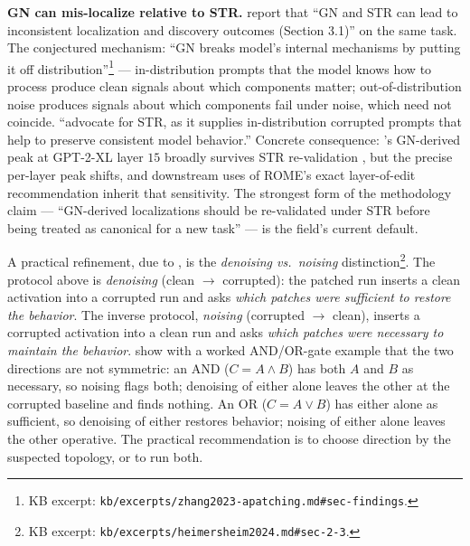 \begin{contradiction}
\textbf{GN can mis-localize relative to STR.}
\citet[\S 1]{zhang2023-apatching} report that ``GN and STR can lead to
inconsistent localization and  discovery outcomes (Section
3.1)'' on the same task. The conjectured mechanism: ``GN breaks
model's internal mechanisms by putting it off
distribution''\footnote{KB excerpt:
\texttt{kb/excerpts/zhang2023-apatching.md\#sec-findings}.} ---
in-distribution prompts that the model knows how to process produce
clean signals about which components matter; out-of-distribution noise
produces signals about which components fail under noise, which need
not coincide. \citet[\S 1]{zhang2023-apatching} ``advocate for STR, as
it supplies in-distribution corrupted prompts that help to preserve
consistent model behavior.'' Concrete consequence:
\citet{meng2022-rome}'s GN-derived  peak at GPT-2-XL layer $15$
broadly survives STR re-validation \citep[\S 3]{zhang2023-apatching},
but the precise per-layer peak shifts, and downstream uses of ROME's
exact layer-of-edit recommendation inherit that sensitivity. The
strongest form of the methodology claim --- ``GN-derived localizations
should be re-validated under STR before being treated as canonical
for a new task'' --- is the field's current default.
\end{contradiction}

A practical refinement, due to
\citet[\S 2.3]{heimersheim2024-apatching-howto}, is the
\emph{denoising vs.\ noising} distinction\footnote{KB excerpt:
\texttt{kb/excerpts/heimersheim2024.md\#sec-2-3}.}. The protocol
above is \emph{denoising} (clean $\to$ corrupted): the patched run
inserts a clean activation into a corrupted run and asks
\emph{which patches were sufficient to restore the behavior}. The
inverse protocol, \emph{noising} (corrupted $\to$ clean), inserts a
corrupted activation into a clean run and asks
\emph{which patches were necessary to maintain the behavior}.
\citet[\S 2.4]{heimersheim2024-apatching-howto} show with a worked
AND/OR-gate example that the two directions are not symmetric: an AND
 ($C = A \wedge B$) has both $A$ and $B$ as necessary, so
noising flags both; denoising of either alone leaves the other at the
corrupted baseline and finds nothing. An OR  ($C = A \vee B$)
has either alone as sufficient, so denoising of either restores
behavior; noising of either alone leaves the other operative. The
practical recommendation is to choose direction by the suspected
 topology, or to run both.

